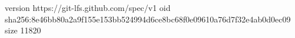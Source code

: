 version https://git-lfs.github.com/spec/v1
oid sha256:8e46bb80a2a9f155e153bb524994d6ce8bc68f0e09610a76d7f32e4ab0d0ec09
size 11820
